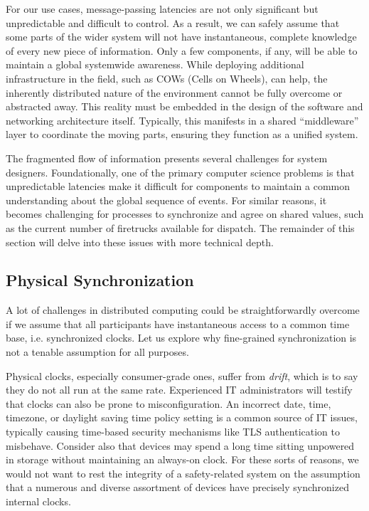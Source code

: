 \documentclass[]             %
{NASA}                       %
\theoremstyle{definition}
\begin{document}
For our use cases, message-passing latencies are not only significant
but unpredictable and difficult to control. As a result, we can safely
assume that some parts of the wider system will not have
instantaneous, complete knowledge of every new piece of
information. Only a few components, if any, will be able to maintain a
global systemwide awareness. While deploying additional infrastructure
in the field, such as COWs (Cells on Wheels), can help, the inherently
distributed nature of the environment cannot be fully overcome or
abstracted away. This reality must be embedded in the design of the
software and networking architecture itself. Typically, this manifests
in a shared ``middleware'' layer to coordinate the moving parts,
ensuring they function as a unified system.

The fragmented flow of information presents several challenges for
system designers. Foundationally, one of the primary computer science
problems is that unpredictable latencies make it difficult for
components to maintain a common understanding about the global
sequence of events. For similar reasons, it becomes challenging for
processes to synchronize and agree on shared values, such as the
current number of firetrucks available for dispatch. The remainder of
this section will delve into these issues with more technical depth.

\subsection{Physical Synchronization}
\label{ssec:physical-synchronization}
A lot of challenges in distributed computing could be
straightforwardly overcome if we assume that all participants have
instantaneous access to a common time base, i.e.  synchronized
clocks. Let us explore why fine-grained synchronization is not a
tenable assumption for all purposes.

Physical clocks, especially consumer-grade ones, suffer from
\emph{drift}, which is to say they do not all run at the same
rate. Experienced IT administrators will testify that clocks can also
be prone to misconfiguration. An incorrect date, time, timezone, or
daylight saving time policy setting is a common source of IT issues,
typically causing time-based security mechanisms like TLS
authentication to misbehave. Consider also that devices may spend a
long time sitting unpowered in storage without maintaining an
always-on clock. For these sorts of reasons, we would not want to rest
the integrity of a safety-related system on the assumption that a
numerous and diverse assortment of devices have precisely synchronized
internal clocks.
\end{document}
